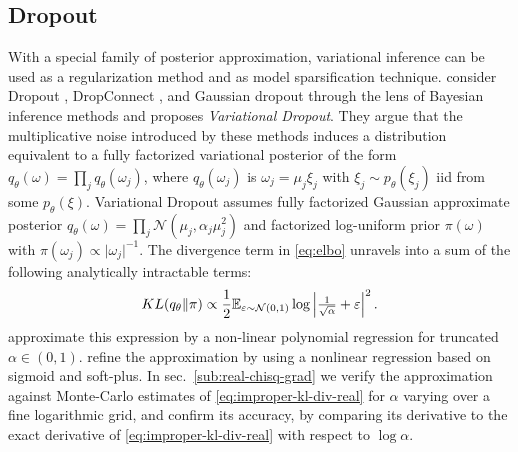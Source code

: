 \documentclass[a4paper,10pt]{article}
\begin{document}
\subsection{Dropout} %
\label{sub:dropout}

With a special family of posterior approximation, variational inference can be used as
a regularization method and as model sparsification technique. \citet{kingma_variational_2015}
consider Dropout \citep{hinton_improving_2012}, DropConnect \citep{wan_regularization_2013},
and Gaussian dropout \citep{srivastava_dropout_2014,wang_fast_2013} through the lens
of Bayesian inference methods and proposes \textit{Variational Dropout}. They argue that
the multiplicative noise introduced by these methods induces a distribution equivalent to
a fully factorized variational posterior of the form $
  q_\theta(\omega) = \prod_j q_{\theta}(\omega_j)
$, where $q_{\theta}(\omega_j)$ is $\omega_j = \mu_j \xi_j$ with $
  \xi_j \sim p_\theta(\xi_j)
$ iid from some $p_\theta(\xi)$.
%
%
Variational Dropout assumes fully factorized Gaussian approximate posterior $
  q_\theta(\omega)
    = \prod_j \mathcal{N}(\mu_j, \alpha_j \mu_j^2)
$ and factorized log-uniform prior $\pi(\omega)$ with $
  \pi(\omega_j) \propto \lvert \omega_j \rvert^{-1}
$. The divergence term in \eqref{eq:elbo} unravels into a sum of the following
analytically intractable terms:
\begin{equation}  \label{eq:improper-kl-div-real}
  KL(q_\theta \| \pi)
    \propto
      \frac12 \mathbb{E}_{\varepsilon \sim \mathcal{N}(0, 1)}
        \log{\Bigl\lvert \tfrac1{\sqrt{\alpha}} + \varepsilon \Bigr\rvert^2}
  \,.
\end{equation}
\citet{kingma_variational_2015} approximate this expression by a non-linear polynomial
regression for truncated $\alpha \in (0, 1)$. \citet{molchanov_variational_2017}
refine the approximation by using a nonlinear regression based on sigmoid and soft-plus.
%
In sec.~\ref{sub:real-chisq-grad} we verify the approximation against Monte-Carlo
estimates of \eqref{eq:improper-kl-div-real} for $\alpha$ varying over a fine logarithmic
grid, and confirm its accuracy, by comparing its derivative to the exact derivative of
\eqref{eq:improper-kl-div-real} with respect to $\log \alpha$.
\end{document}
